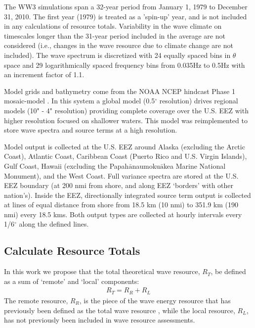 The WW3 simulations span a 32-year period from January 1, 1979 to December 31, 2010. The first year (1979) is treated as a 'spin-up' year, and is not included in any calculations of resource totals. Variability in the wave climate on timescales longer than the 31-year period included in the average are not considered (i.e., changes in the wave resource due to climate change are not included). The wave spectrum is discretized with 24 equally spaced bins in $\theta$ space and 29 logarithmically spaced frequency bins from 0.035Hz to 0.5Hz with an increment factor of 1.1. 

Model grids and bathymetry come from the NOAA NCEP hindcast Phase 1 mosaic-model \citep{chawla2011wavewatch,chawla201230}. In this system a global model (0.5$^{\circ}$ resolution) drives regional models (10" - 4" resolution) providing complete coverage over the U.S. EEZ with higher resolution focused on shallower waters. This model was reimplemented to store wave spectra and source terms at a high resolution.

Model output is collected at the U.S. EEZ around Alaska (excluding the Arctic Coast), Atlantic Coast, Caribbean Coast (Puerto Rico and U.S. Virgin Islands), Gulf Coast, Hawaii (excluding the Papah$\bar{\text{a}}$naumoku$\bar{\text{a}}$kea Marine National Monument), and the West Coast. Full variance spectra are stored at the U.S. EEZ boundary (at 200 nmi from shore, and along EEZ `borders' with other nation's). Inside the EEZ, directionally integrated source term output is collected at lines of equal distance from shore from 18.5 km (10 nmi) to 351.9 km (190 nmi) every 18.5 kms. Both output types are collected at hourly intervals every 1/6$^{\circ}$ along the defined lines.


\subsection{Calculate Resource Totals} \label{sec:method:calc}

In this work we propose that the total theoretical wave resource, $R_T$, be defined as a sum of `remote' and `local' components:
\begin{align}
  R_T = R_R + R_L
\end{align}
The remote resource, $R_R$, is the piece of the wave energy resource that has previously been defined as the total wave resource \citep{gunnQuantifyingGlobalWave2012,EPRIwaveresource2011}, while the local resource, $R_L$, has not previously been included in wave resource assessments.

